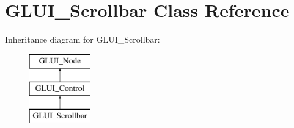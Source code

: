 \hypertarget{classGLUI__Scrollbar}{\section{G\-L\-U\-I\-\_\-\-Scrollbar Class Reference}
\label{classGLUI__Scrollbar}
}
Inheritance diagram for G\-L\-U\-I\-\_\-\-Scrollbar\-:\begin{figure}[H]
\begin{center}
\leavevmode
\includegraphics[height=3.000000cm]{classGLUI__Scrollbar}
\end{center}
\end{figure}
